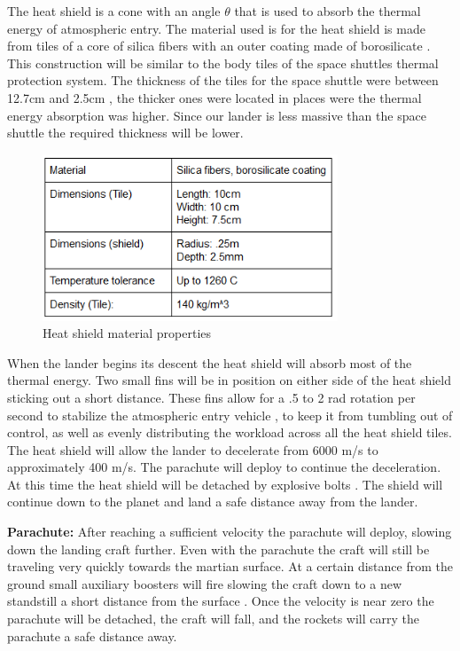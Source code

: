 \documentclass[%
 portrait,
 aapm,
 mph,%
 amsmath,amssymb,
 reprint,%
]{revtex4-2}
\begin{document}
The heat shield is a cone with an angle \begin{math} \theta \end{math} that is used to absorb the thermal energy of atmospheric entry.  The material used is for the heat shield is made from tiles of a core of silica fibers with an outer coating made of borosilicate \cite{wiki:001}.  This construction will be similar to the body tiles of the space shuttles thermal protection system.  The thickness of the tiles for the space shuttle were between 12.7cm and 2.5cm \cite{wiki:001}, the thicker ones were located in places were the thermal energy absorption was higher.  Since our lander is less massive than the space shuttle the required thickness will be lower.
\begin{figure}[h!]
  \includegraphics[width=250pt]{DescentandLanding/yHSMatProp.png}
   \caption{Heat shield material properties}
\end{figure} 

When the lander begins its descent the heat shield will absorb most of the thermal energy.  Two small fins will be in position on either side of the heat shield sticking out a short distance.  These fins allow for a .5 to 2 rad rotation per second to stabilize the atmospheric entry vehicle \cite{garber1961analysis}, to keep it from tumbling out of control, as well as evenly distributing the workload across all the heat shield tiles.  The heat shield will allow the lander to decelerate from 6000 m/s to approximately 400 m/s. The parachute will deploy to continue the deceleration.  At this time the heat shield will be detached by explosive bolts \cite{JPL:000}.  The shield will continue down to the planet and land a safe distance away from the lander.

\textbf{Parachute:} After reaching a sufficient velocity the parachute will deploy, slowing down the landing craft further.  Even with the parachute the craft will still be traveling very quickly towards the martian surface.  At a certain distance from the ground small auxiliary boosters will fire slowing the craft down to a new standstill a short distance from the surface \cite{NASAMarsExplorationRovers:002}.  Once the velocity is near zero the parachute will be detached, the craft will fall, and the rockets will carry the parachute a safe distance away.
\end{document}
